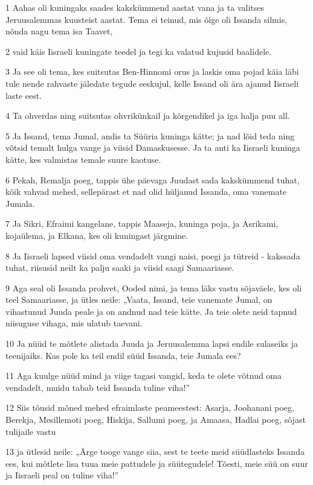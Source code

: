 \par 1 Aahas oli kuningaks saades kakskümmend aastat vana ja ta valitses Jeruusalemmas kuusteist aastat. Tema ei teinud, mis õige oli Issanda silmis, nõnda nagu tema isa Taavet,
\par 2 vaid käis Iisraeli kuningate teedel ja tegi ka valatud kujusid baalidele.
\par 3 Ja see oli tema, kes suitsutas Ben-Hinnomi orus ja laskis oma pojad käia läbi tule nende rahvaste jäledate tegude eeskujul, kelle Issand oli ära ajanud Iisraeli laste eest.
\par 4 Ta ohverdas ning suitsutas ohvrikünkail ja kõrgendikel ja iga halja puu all.
\par 5 Ja Issand, tema Jumal, andis ta Süüria kuninga kätte; ja nad lõid teda ning võtsid temalt hulga vange ja viisid Damaskusesse. Ja ta anti ka Iisraeli kuninga kätte, kes valmistas temale suure kaotuse.
\par 6 Pekah, Remalja poeg, tappis ühe päevaga Juudast sada kakskümmend tuhat, kõik vahvad mehed, sellepärast et nad olid hüljanud Issanda, oma vanemate Jumala.
\par 7 Ja Sikri, Efraimi kangelane, tappis Maaseja, kuninga poja, ja Asrikami, kojaülema, ja Elkana, kes oli kuningast järgmine.
\par 8 Ja Iisraeli lapsed viisid oma vendadelt vangi naisi, poegi ja tütreid - kakssada tuhat, riisusid neilt ka palju saaki ja viisid saagi Samaariasse.
\par 9 Aga seal oli Issanda prohvet, Ooded nimi, ja tema läks vastu sõjaväele, kes oli teel Samaariasse, ja ütles neile: „Vaata, Issand, teie vanemate Jumal, on vihastunud Juuda peale ja on andnud nad teie kätte. Ja teie olete neid tapnud niisuguse vihaga, mis ulatub taevani.
\par 10 Ja nüüd te mõtlete alistada Juuda ja Jeruusalemma lapsi endile sulaseiks ja teenijaiks. Kas pole ka teil endil süüd Issanda, teie Jumala ees?
\par 11 Aga kuulge nüüd mind ja viige tagasi vangid, keda te olete võtnud oma vendadelt, muidu tabab teid Issanda tuline viha!”
\par 12 Siis tõusid mõned mehed efraimlaste peameestest: Asarja, Joohanani poeg, Berekja, Mesillemoti poeg, Hiskija, Sallumi poeg, ja Amaasa, Hadlai poeg, sõjast tulijaile vastu
\par 13 ja ütlesid neile: „Ärge tooge vange siia, sest te teete meid süüdlasteks Issanda ees, kui mõtlete lisa tuua meie pattudele ja süütegudele! Tõesti, meie süü on suur ja Iisraeli peal on tuline viha!”

